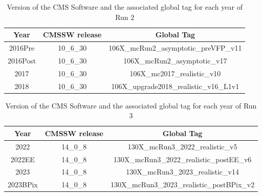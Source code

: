 \documentclass{cernatlasnote}
\begin{document}
\begin{table}
    \centering
    \begin{tabular}{| c | c | c |}
    \hline
    \rowcolor{lightgray} 
         Year &  CMSSW release & Global Tag  \\
    \hline
         2016Pre & 10\_6\_30&   106X\_mcRun2\_asymptotic\_preVFP\_v11\\
    \hline
         2016Post & 10\_6\_30 &  106X\_mcRun2\_asymptotic\_v17  \\
    \hline
         2017 & 10\_6\_30 &  106X\_mc2017\_realistic\_v10  \\
    \hline
         2018 & 10\_6\_30  &  106X\_upgrade2018\_realistic\_v16\_L1v1 \\
    \hline
    \end{tabular}
    \caption{Version of the CMS Software and the associated global tag for each year of Run 2}
    \label{tab:MCSET}
\end{table}

\begin{table}
    \centering
    \begin{tabular}{| c | c | c |}
    \hline
    \rowcolor{lightgray} 
         Year &  CMSSW release & Global Tag  \\
    \hline
         2022 & 14\_0\_8 &   130X\_mcRun3\_2022\_realistic\_v5\\
    \hline
         2022EE & 14\_0\_8 &  130X\_mcRun3\_2022\_realistic\_postEE\_v6  \\
    \hline
         2023 & 14\_0\_8 &  130X\_mcRun3\_2023\_realistic\_v14  \\
    \hline
         2023BPix & 14\_0\_8 &   130X\_mcRun3\_2023\_realistic\_postBPix\_v2 \\
    \hline
    \end{tabular}
    \caption{Version of the CMS Software and the associated global tag for each year of Run 3}
    \label{tab:MCSETRun3}
\end{table}
\end{document}

